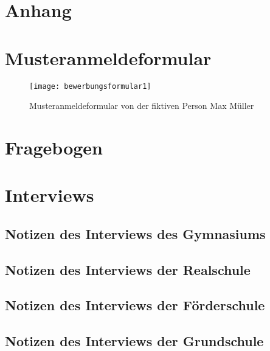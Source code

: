 
\newpage
\section{Anhang}
\appendix
{} %

\section{Musteranmeldeformular}
\label{section-Musteranmeldeformular}
\begin{figure}[H]
    \centering
    \caption{Musteranmeldeformular von der fiktiven Person Max Müller}
    \begin{adjustbox}{height=0.85\textheight, center}
        \texttt{[image: bewerbungsformular1]}
    \end{adjustbox}
    \label{fig:anmeldeformular}
\end{figure}

\section{Fragebogen}
\label{section-fragebogen}


\section{Interviews}
\subsection{Notizen des Interviews des Gymnasiums}
\label{section-InterviewGymnasium}


\subsection{Notizen des Interviews der Realschule}
\label{section-InterviewRealschule}


\subsection{Notizen des Interviews der Förderschule}
\label{section-InterviewFoerderschule}


\subsection{Notizen des Interviews der Grundschule}
\label{section-InterviewGrundschule}


